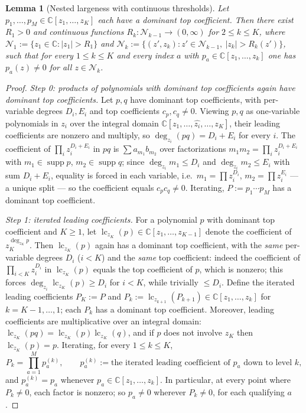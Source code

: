 \documentclass[11pt]{article}
\newtheorem{lemma}[theorem]{Lemma}
\theoremstyle{definition}
\theoremstyle{remark}
\theoremstyle{plain}
\newcommand{\C}{\mathbb{C}}
\newcommand{\cN}{\mathcal{N}}
\begin{document}
\begin{lemma}[Nested largeness with continuous thresholds]\label{lem:nested}
Let $p_1,\dots,p_M\in\C[z_1,\dots,z_K]$ each have a dominant top coefficient.  Then there
exist $R_1>0$ and continuous functions $R_k:\cN_{k-1}\to(0,\infty)$ for
$2\le k\le K$, where $\cN_1:=\{z_1\in\C:|z_1|>R_1\}$ and
$\cN_k:=\{(z',z_k):z'\in\cN_{k-1},\ |z_k|>R_k(z')\}$, such that for every
$1\le k\le K$ and every index $a$ with $p_a\in\C[z_1,\dots,z_k]$ one has
$p_a(z)\neq0$ for all $z\in\cN_k$.
\end{lemma}

\begin{proof}
\emph{Step 0: products of polynomials with dominant top coefficients again have dominant
top coefficients.}  Let $p,q$ have dominant top coefficients, with per-variable degrees
$D_i,E_i$ and top coefficients $c_p,c_q\neq0$.  Viewing $p,q$ as one-variable polynomials
in $z_i$ over the integral domain $\C[z_1,\dots,\widehat{z_i},\dots,z_K]$, their leading
coefficients are nonzero and multiply, so $\deg_{z_i}(pq)=D_i+E_i$ for every $i$.  The
coefficient of $\prod_iz_i^{D_i+E_i}$ in $pq$ is
$\sum a_{m_1}b_{m_2}$ over factorizations $m_1m_2=\prod_iz_i^{D_i+E_i}$ with
$m_1\in\operatorname{supp}p$, $m_2\in\operatorname{supp}q$; since
$\deg_{z_i}m_1\le D_i$ and $\deg_{z_i}m_2\le E_i$ with sum $D_i+E_i$, equality is forced
in each variable, i.e.\ $m_1=\prod z_i^{D_i}$, $m_2=\prod z_i^{E_i}$ --- a unique split
--- so the coefficient equals $c_pc_q\neq0$.  Iterating, $P:=p_1\cdots p_M$ has a
dominant top coefficient.

\emph{Step 1: iterated leading coefficients.}  For a polynomial $p$ with dominant top
coefficient and $K\ge1$, let $\operatorname{lc}_{z_K}(p)\in\C[z_1,\dots,z_{K-1}]$ denote
the coefficient of $z_K^{\deg_{z_K}p}$.  Then $\operatorname{lc}_{z_K}(p)$ again has a
dominant top coefficient, with the \emph{same} per-variable degrees $D_i$ ($i<K$) and the
\emph{same} top coefficient: indeed the coefficient of $\prod_{i<K}z_i^{D_i}$ in
$\operatorname{lc}_{z_K}(p)$ equals the top coefficient of $p$, which is nonzero; this
forces $\deg_{z_i}\operatorname{lc}_{z_K}(p)\ge D_i$ for $i<K$, while trivially $\le D_i$.
Define the iterated leading coefficients $P_K:=P$ and
$P_k:=\operatorname{lc}_{z_{k+1}}(P_{k+1})\in\C[z_1,\dots,z_k]$ for $k=K-1,\dots,1$; each
$P_k$ has a dominant top coefficient.  Moreover, leading coefficients are multiplicative
over an integral domain:
$\operatorname{lc}_{z_K}(pq)=\operatorname{lc}_{z_K}(p)\operatorname{lc}_{z_K}(q)$, and if
$p$ does not involve $z_K$ then $\operatorname{lc}_{z_K}(p)=p$.  Iterating, for every
$1\le k\le K$,
\[
P_k=\prod_{a=1}^M p_a^{(k)},\qquad
p_a^{(k)}:=\text{the iterated leading coefficient of }p_a\text{ down to level }k,
\]
and $p_a^{(k)}=p_a$ whenever $p_a\in\C[z_1,\dots,z_k]$.  In particular, at every point
where $P_k\neq0$, each factor is nonzero; so $p_a\neq0$ wherever $P_k\neq0$, for each
qualifying $a$.


\end{proof}
\end{document}
